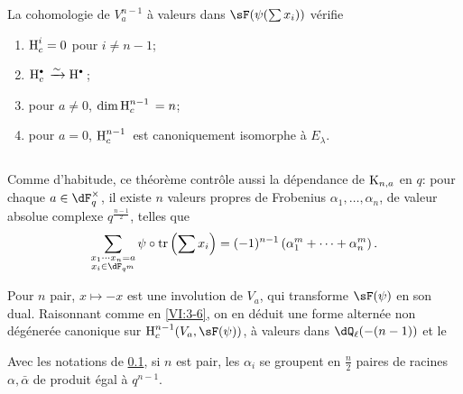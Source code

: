 \begin{theorem_}\label{VI:7-4}
La cohomologie de $V_a^{n-1}$ \`a valeurs dans $\sF(\psi(\sum x_i))$ v\'erifie 
\begin{enumerate}[\indent (i)]
  \item $\operatorname{H}_c^i=0$ pour $i\ne n-1$; 
  \item $\h_c^\bullet{} \iso \h^\bullet{}$; 
  \item pour $a\ne 0$, $\dim \operatorname{H}_c^{n-1}{}=n$; 
  \item pour $a=0$, $\operatorname{H}_c^{n-1}{}$ est canoniquement isomorphe \`a $E_\lambda$. 
\end{enumerate}
\end{theorem_}





\subsection{}\label{VI:7-5}

Comme d'habitude, ce th\'eor\`eme contr\^ole aussi la d\'ependance de 
$\textnormal{K}_{n,a}$ en $q$: pour chaque $a\in \dF_q^\times$, il existe $n$ valeurs 
propres de Frobenius $\alpha_1,\dots,\alpha_n$, de valeur absolue complexe 
$q^{\frac{n-1}{2}}$, telles que 
\[
  \sum_{\substack{x_1\dotsm x_n = a \\ x_i\in \dF_{q^m}}} \psi\circ \tr\left(\sum x_i\right) = (-1)^{n-1} \left(\alpha_1^m + \cdots + \alpha_n^m \right) \text{.} 
\]

Pour $n$ pair, $x\mapsto -x$ est une involution de $V_a$, qui transforme 
$\sF(\psi)$ en son dual. Raisonnant comme en \ref{VI:3-6}, on en d\'eduit une 
forme altern\'ee non d\'eg\'ener\'ee canonique sur $\h_c^{n-1}(V_a,\sF(\psi))$, 
\`a valeurs dans $\dQ_\ell(-(n-1))$ et le 





\begin{corollary_}\label{VI:7-6}
Avec les notations de \ref{VI:7-5}, si $n$ est pair, les $\alpha_i$ se groupent 
en $\frac n 2$ paires de racines $\alpha,\bar\alpha$ de produit \'egal \`a 
$q^{n-1}$. 
\end{corollary_}





\subsection{}\label{VI:7-7}

